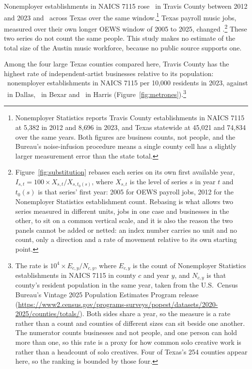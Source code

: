 Nonemployer establishments in NAICS 7115 rose
\NSubstitutionNonemployerTravisPctchg\ in Travis County between 2012 and
2023 and \NSubstitutionNonemployerTxPctchg\ across Texas over the same
window.\footnote{Nonemployer Statistics reports Travis County
establishments in NAICS 7115 at 5{,}382 in 2012 and 8{,}696 in 2023, and
Texas statewide at 45{,}021 and 74{,}834 over the same years. Both figures
are business counts, not people, and the Bureau's noise-infusion procedure
means a single county cell has a slightly larger measurement error than the
state total.} Texas payroll music jobs, measured over their own longer OEWS
window of 2005 to 2025, changed
\NEmpPayrollPctchgMusiciansTx.\footnote{Figure~\ref{fig:substitution}
rebases each series on its own first available year,
\(I_{s,t} = 100 \times X_{s,t} / X_{s,t_0(s)}\), where \(X_{s,t}\) is the
level of series \(s\) in year \(t\) and \(t_0(s)\) is that series' first
year: 2005 for OEWS payroll jobs, 2012 for the Nonemployer Statistics
establishment count. Rebasing is what allows two series measured in
different units, jobs in one case and businesses in the other, to sit on a
common vertical scale, and it is also the reason the two panels cannot be
added or netted: an index number carries no unit and no count, only a
direction and a rate of movement relative to its own starting point.} These
two series do not count the same people. This study makes no estimate of
the total size of the Austin music workforce, because no public source
supports one.

Among the four large Texas counties compared here, Travis County has the
highest rate of independent-artist businesses relative to its population:
\NNesEstabPerOneZerokTravisTwoZeroTwoThree\ nonemployer establishments in
NAICS 7115 per 10{,}000 residents in 2023, against
\NNesEstabPerOneZerokDallasTwoZeroTwoThree\ in Dallas,
\NNesEstabPerOneZerokBexarTwoZeroTwoThree\ in Bexar and
\NNesEstabPerOneZerokHarrisTwoZeroTwoThree\ in Harris
(Figure~\ref{fig:metrones}).\footnote{The rate is
\(10^{4} \times E_{c,y} / N_{c,y}\), where \(E_{c,y}\) is the count of
Nonemployer Statistics establishments in NAICS 7115 in county \(c\) and
year \(y\), and \(N_{c,y}\) is that county's resident population in the
same year, taken from the U.S.\ Census Bureau's Vintage 2025 Population
Estimates Program release
(\url{https://www2.census.gov/programs-surveys/popest/datasets/2020-2025/counties/totals/}).
Both sides share a year, so the measure is a rate rather than a count and
counties of different sizes can sit beside one another. The numerator
counts businesses and not people, and one person can hold more than one,
so this rate is a proxy for how common solo creative work is rather than
a headcount of solo creatives. Four of Texas's 254 counties appear here,
so the ranking is bounded by those four.}


